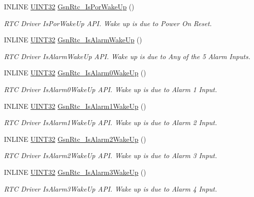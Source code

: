 \begin{DoxyCompactItemize}
INLINE \hyperlink{a00660_gae1e6edbbc26d6fbc71a90190d0266018}{UINT32} \hyperlink{a00651_gac8dbdbc4b1c56ab9676f530d5c2a3832}{GsnRtc\_\-IsPorWakeUp} ()
\begin{DoxyCompactList}\small\item\em RTC Driver IsPorWakeUp API. Wake up is due to Power On Reset. \end{DoxyCompactList}\item 
INLINE \hyperlink{a00660_gae1e6edbbc26d6fbc71a90190d0266018}{UINT32} \hyperlink{a00651_gad1ed2ab29251cd12aa6111b17f0e2cd3}{GsnRtc\_\-IsAlarmWakeUp} ()
\begin{DoxyCompactList}\small\item\em RTC Driver IsAlarmWakeUp API. Wake up is due to Any of the 5 Alarm Inputs. \end{DoxyCompactList}\item 
INLINE \hyperlink{a00660_gae1e6edbbc26d6fbc71a90190d0266018}{UINT32} \hyperlink{a00651_ga29ead4066eafd8132311c4930354dda9}{GsnRtc\_\-IsAlarm0WakeUp} ()
\begin{DoxyCompactList}\small\item\em RTC Driver IsAlarm0WakeUp API. Wake up is due to Alarm 1 Input. \end{DoxyCompactList}\item 
INLINE \hyperlink{a00660_gae1e6edbbc26d6fbc71a90190d0266018}{UINT32} \hyperlink{a00651_ga2847e2771d32e17781aa788bd01e514b}{GsnRtc\_\-IsAlarm1WakeUp} ()
\begin{DoxyCompactList}\small\item\em RTC Driver IsAlarm1WakeUp API. Wake up is due to Alarm 2 Input. \end{DoxyCompactList}\item 
INLINE \hyperlink{a00660_gae1e6edbbc26d6fbc71a90190d0266018}{UINT32} \hyperlink{a00651_gacc97418bf621c4596f24bfc475ed51f7}{GsnRtc\_\-IsAlarm2WakeUp} ()
\begin{DoxyCompactList}\small\item\em RTC Driver IsAlarm2WakeUp API. Wake up is due to Alarm 3 Input. \end{DoxyCompactList}\item 
INLINE \hyperlink{a00660_gae1e6edbbc26d6fbc71a90190d0266018}{UINT32} \hyperlink{a00651_gadb9866fc21dcef32deabace308a78200}{GsnRtc\_\-IsAlarm3WakeUp} ()
\begin{DoxyCompactList}\small\item\em RTC Driver IsAlarm3WakeUp API. Wake up is due to Alarm 4 Input. \end{DoxyCompactList}\item 

\end{DoxyCompactItemize}
